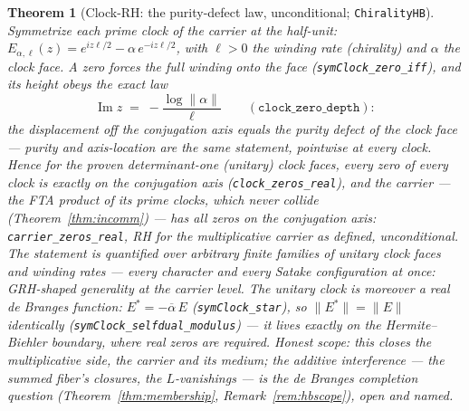 \documentclass[11pt]{article}
\newtheorem{theorem}[definition]{Theorem}
\newcommand{\conj}[1]{\overline{#1}}
\newcommand{\code}[1]{\texttt{#1}}
\begin{document}
\begin{theorem}[Clock-RH: the purity-defect law, unconditional; \code{ChiralityHB}]\label{thm:clockrh}
Symmetrize each prime clock of the carrier at the half-unit:
$E_{\alpha,\ell}(z)=e^{iz\ell/2}-\alpha\,e^{-iz\ell/2}$, with $\ell>0$ the winding rate
(\emph{chirality}) and $\alpha$ the clock face.  A zero forces the full winding onto the face
(\code{symClock\_zero\_iff}), and its height obeys the exact law
\[
  \operatorname{Im}z\;=\;-\frac{\log\|\alpha\|}{\ell}
  \qquad(\code{clock\_zero\_depth}):
\]
\emph{the displacement off the conjugation axis equals the purity defect of the clock face} ---
purity and axis-location are the same statement, pointwise at every clock.  Hence for the proven
determinant-one (unitary) clock faces, every zero of every clock is exactly on the conjugation
axis (\code{clock\_zeros\_real}), and the carrier --- the FTA product of its prime clocks, which
never collide (Theorem~\ref{thm:incomm}) --- has all zeros on the conjugation axis:
\code{carrier\_zeros\_real}, \emph{RH for the multiplicative carrier as defined, unconditional}.
The statement is quantified over \emph{arbitrary finite families} of unitary clock faces and
winding rates --- every character and every Satake configuration at once: GRH-shaped generality
at the carrier level.
The unitary clock is moreover a \emph{real} de Branges function: $E^{*}=-\conj\alpha\,E$
(\code{symClock\_star}), so $\|E^{*}\|=\|E\|$ identically (\code{symClock\_selfdual\_modulus}) ---
it lives exactly on the Hermite--Biehler boundary, where real zeros are required.  Honest scope:
this closes the \emph{multiplicative} side, the carrier and its medium; the additive interference
--- the summed fiber's closures, the $L$-vanishings --- is the de Branges completion question
(Theorem~\ref{thm:membership}, Remark~\ref{rem:hbscope}), open and named.
\end{theorem}
\end{document}
